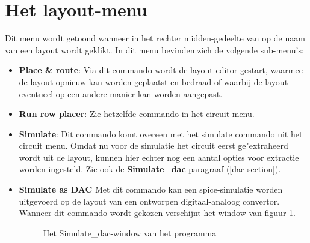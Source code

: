 \section{Het layout-menu}
Dit menu wordt getoond wanneer in het rechter midden-gedeelte van 
op de naam van een layout wordt geklikt.
In dit menu bevinden zich de volgende sub-menu's:
\begin{itemize}
\item {\bf Place \& route}: Via dit commando wordt de layout-editor  gestart, 
waarmee de layout opnieuw kan worden geplaatst en bedraad of waarbij de layout
eventueel op een andere manier kan worden aangepast.
\item {\bf Run row placer}:
Zie hetzelfde commando in het circuit-menu.
\item {\bf Simulate}:
Dit commando komt overeen met het simulate commando uit het circuit menu.
Omdat nu voor de simulatie het circuit eerst ge"extraheerd wordt uit de layout,
kunnen hier echter nog een aantal opties voor extractie worden ingesteld.
Zie ook de {\bf Simulate\_dac} paragraaf (\ref{dac-section}).
\item{\bf Simulate as DAC}
\label{dac-section}
Met dit commando kan een spice-simulatie worden uitgevoerd op de layout van
een ontworpen digitaal-analoog convertor.\\
Wanneer dit commando wordt gekozen verschijnt het window van figuur \ref{dac-window}.

\begin{figure}[htb]
\centerline{}
\caption{Het Simulate\_dac-window van het programma }
\label{dac-window}
\end{figure}


\end{itemize}
